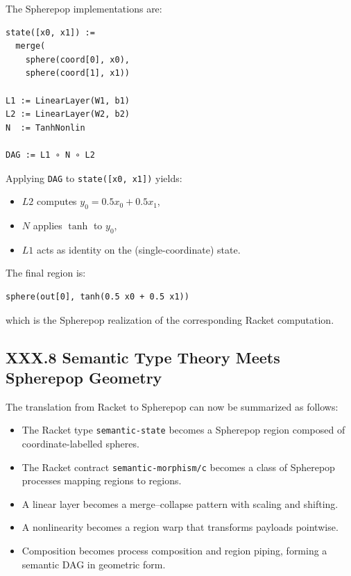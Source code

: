 \documentclass[12pt,letterpaper]{article}
\begin{document}
The Spherepop implementations are:

\begin{verbatim}
state([x0, x1]) :=
  merge(
    sphere(coord[0], x0),
    sphere(coord[1], x1))

L1 := LinearLayer(W1, b1)
L2 := LinearLayer(W2, b2)
N  := TanhNonlin

DAG := L1 ∘ N ∘ L2
\end{verbatim}

Applying \verb|DAG| to \verb|state([x0, x1])| yields:

\begin{itemize}
  \item $L2$ computes $y_0 = 0.5 x_0 + 0.5 x_1$,
  \item $N$ applies $\tanh$ to $y_0$,
  \item $L1$ acts as identity on the (single-coordinate) state.
\end{itemize}

The final region is:

\begin{verbatim}
sphere(out[0], tanh(0.5 x0 + 0.5 x1))
\end{verbatim}

which is the Spherepop realization of the corresponding Racket computation.

\subsection{XXX.8 Semantic Type Theory Meets Spherepop Geometry}

The translation from Racket to Spherepop can now be summarized as follows:

\begin{itemize}
  \item The Racket type \verb|semantic-state| becomes a Spherepop region composed of coordinate-labelled spheres.
  \item The Racket contract \verb|semantic-morphism/c| becomes a class of Spherepop processes mapping regions to regions.
  \item A linear layer becomes a merge--collapse pattern with scaling and shifting.
  \item A nonlinearity becomes a region warp that transforms payloads pointwise.
  \item Composition becomes process composition and region piping, forming a semantic DAG in geometric form.
\end{itemize}
\end{document}
